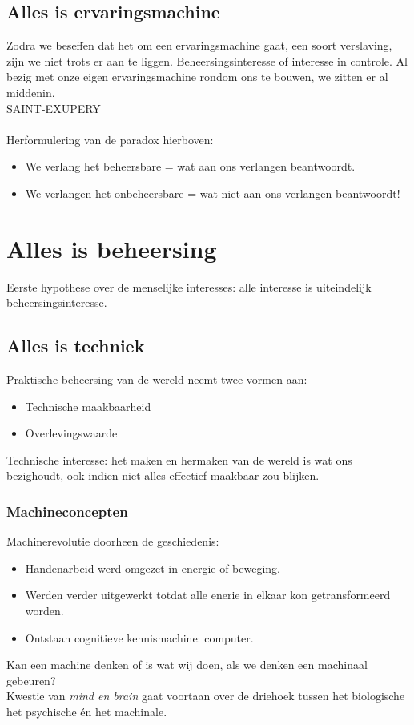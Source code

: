 \documentclass[11pt,a4paper]{article}
\begin{document}
\subsection{Alles is ervaringsmachine}
Zodra we beseffen dat het om een ervaringsmachine gaat, een soort verslaving, zijn we niet trots er aan te liggen. 
Beheersingsinteresse of interesse in controle. 
Al bezig met onze eigen ervaringsmachine rondom ons te bouwen, we zitten er al middenin.
\\
SAINT-EXUPERY
\\
\\
Herformulering van de paradox hierboven:
\begin{itemize}
\item We verlang het beheersbare = wat aan ons verlangen beantwoordt. 
\item We verlangen het onbeheersbare = wat niet aan ons verlangen beantwoordt!
\end{itemize}


\section{Alles is beheersing}
Eerste hypothese over de menselijke interesses: alle interesse is uiteindelijk beheersingsinteresse.

\subsection{Alles is techniek}
Praktische beheersing van de wereld neemt twee vormen aan:
\begin{itemize}
\item Technische maakbaarheid
\item Overlevingswaarde
\end{itemize}
Technische interesse: het maken en hermaken van de wereld is wat ons bezighoudt, ook indien niet alles effectief maakbaar zou blijken.
\subsubsection*{Machineconcepten}
Machinerevolutie doorheen de geschiedenis:
\begin{itemize}
\item Handenarbeid werd omgezet in energie of beweging.
\item Werden verder uitgewerkt totdat alle enerie in elkaar kon getransformeerd worden.
\item Ontstaan cognitieve kennismachine: computer.
\end{itemize}
Kan een machine denken of is wat wij doen, als we denken een machinaal gebeuren?\\ 
Kwestie van \textit{mind en brain} gaat voortaan over de driehoek tussen het biologische het psychische \'en het machinale.
\end{document}
